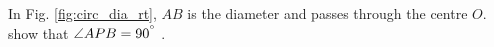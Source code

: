 %
%
%
%		

%

%
\iffalse
\item
In Fig. \ref{fig:circ_dia_rt}, $AB$ is the diameter and passes through the centre $O$.  show that $\angle APB = 90^{\degree}$ .

